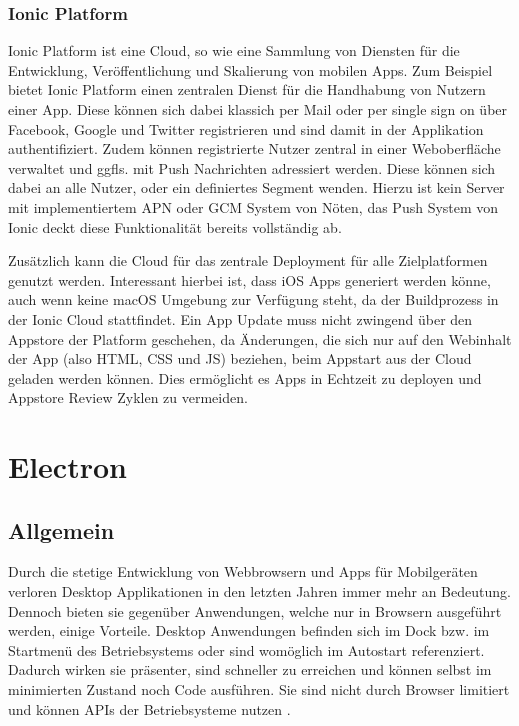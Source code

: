 \subsubsection{Ionic Platform}

Ionic Platform ist eine Cloud, so wie eine Sammlung von Diensten für die Entwicklung,
Veröffentlichung und Skalierung von mobilen Apps. Zum Beispiel bietet Ionic Platform einen zentralen Dienst für die Handhabung von Nutzern einer App.
Diese können sich dabei klassich per Mail oder per single sign on über
Facebook, Google und Twitter registrieren und sind damit in der Applikation authentifiziert.
Zudem können registrierte Nutzer zentral in einer Weboberfläche verwaltet und ggfls. mit Push Nachrichten adressiert werden.
Diese können sich dabei an alle Nutzer, oder ein definiertes Segment wenden.
Hierzu ist kein Server mit implementiertem \ac{APN} oder \ac{GCM} System von Nöten, das Push System von Ionic deckt diese
Funktionalität bereits vollständig ab.

Zusätzlich kann die Cloud für das zentrale Deployment für alle Zielplatformen genutzt werden.
Interessant hierbei ist, dass iOS Apps generiert werden könne, auch wenn
keine macOS Umgebung zur Verfügung steht, da der Buildprozess in der Ionic Cloud stattfindet.
Ein App Update muss nicht zwingend über den Appstore der Platform geschehen,
da Änderungen, die sich nur auf den Webinhalt der App (also HTML, CSS und JS) beziehen,
beim Appstart aus der Cloud geladen werden können.
Dies ermöglicht es Apps in Echtzeit zu deployen und Appstore Review Zyklen zu vermeiden.


\section{Electron}
\subsection{Allgemein}

Durch die stetige Entwicklung von Webbrowsern und Apps für Mobilgeräten verloren Desktop Applikationen in den letzten Jahren immer mehr an Bedeutung.
Dennoch bieten sie gegenüber Anwendungen, welche nur in Browsern ausgeführt werden, einige Vorteile.
Desktop Anwendungen befinden sich im Dock bzw. im Startmenü des Betriebsystems oder sind womöglich im Autostart referenziert.
Dadurch wirken sie präsenter, sind schneller zu erreichen und können selbst im minimierten Zustand noch Code ausführen.
Sie sind nicht durch Browser limitiert und können APIs der Betriebsysteme nutzen \cite{Build58:online}.

